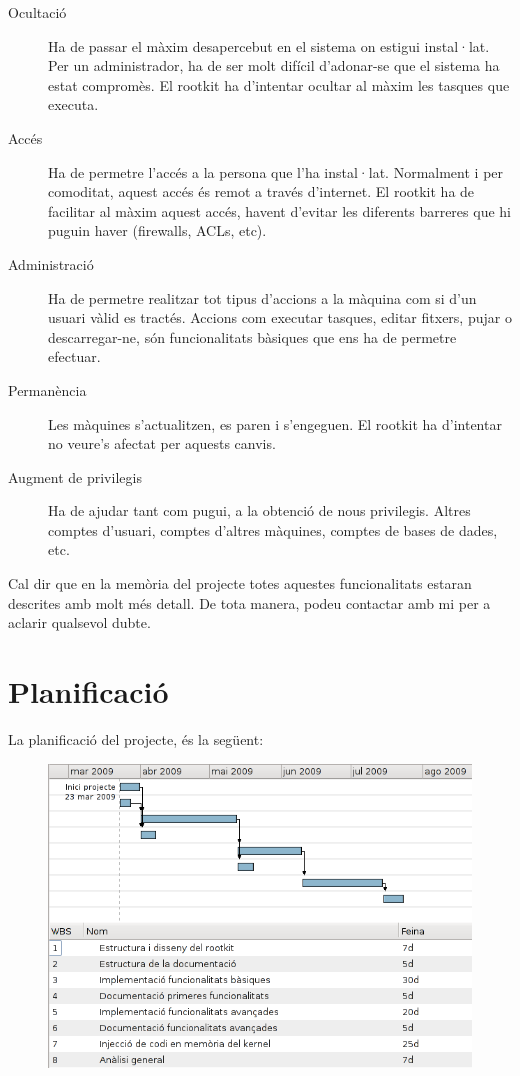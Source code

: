 \documentclass[a4paper]{article}
\begin{document}
\begin{description}
    \item[Ocultació] Ha de passar el màxim desapercebut en el sistema on estigui
    instal·lat. Per un administrador, ha de ser molt difícil d'adonar-se que el
    sistema ha estat compromès. El rootkit ha d'intentar ocultar al màxim les tasques
    que executa. 

    \item[Accés] Ha de permetre l'accés a la persona que
    l'ha instal·lat. Normalment i per comoditat, aquest accés és remot a través
    d'internet. El rootkit ha de facilitar al màxim aquest accés, havent d'evitar les diferents 
    barreres que hi puguin haver (firewalls, ACLs, etc). 

    \item[Administració] Ha de permetre realitzar tot tipus
    d'accions a la màquina com si d'un usuari vàlid es tractés. Accions com executar
    tasques, editar fitxers, pujar o descarregar-ne, són funcionalitats bàsiques que ens
    ha de permetre efectuar. 

    \item[Permanència] Les màquines s'actualitzen, es paren i s'engeguen. El rootkit ha
    d'intentar no veure's afectat per aquests canvis. 

    \item[Augment de privilegis] Ha de ajudar tant com pugui, a la obtenció de nous
    privilegis. Altres comptes d'usuari, comptes d'altres màquines, comptes de bases de dades, etc.
\end{description}
Cal dir que en la memòria del projecte totes aquestes funcionalitats estaran descrites amb molt més detall. De 
tota manera, podeu contactar amb mi per a aclarir qualsevol dubte. 

\section{Planificació}

La planificació del projecte, és la següent:
\begin{figure}[htp]
    \centering
		\includegraphics[scale=0.7,keepaspectratio]{primer_gantt.png} 
    \label{fig:gantt}
\end{figure}
\end{document}
